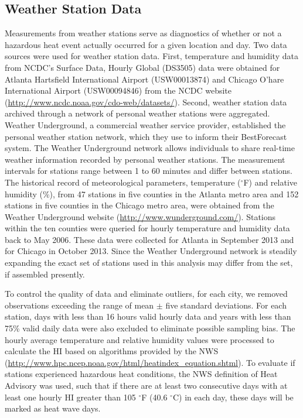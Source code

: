 \documentclass{ametsoc}
\begin{document}
\subsection{Weather Station Data}\label{subsec:WUNDERdata}
Measurements from weather stations serve as diagnostics of whether or not a hazardous heat event actually occurred for a given location and day. Two data sources were used for weather station data. First, temperature and humidity data from NCDC's Surface Data, Hourly Global (DS3505) data were obtained for Atlanta Hartsfield International Airport (USW00013874) and Chicago O'hare International Airport (USW00094846) from the NCDC website (\url{http://www.ncdc.noaa.gov/cdo-web/datasets/}). Second, weather station data archived through a network of personal weather stations were aggregated. Weather Underground, a commercial weather service provider, established the personal weather station network, which they use to inform their BestForecast\textsuperscript{\textregistered} system. The Weather Underground network allows individuals to share real-time weather information recorded by personal weather stations. The measurement intervals for stations range between 1 to 60 minutes and differ between stations. The historical record of meteorological parameters, temperature ($^{\circ}$F) and relative humidity (\%), from 47 stations in five counties in the Atlanta metro area and 152 stations in five counties in the Chicago metro area, were obtained from the Weather Underground website (\url{http://www.wunderground.com/}). Stations within the ten counties were queried for hourly temperature and humidity data back to May 2006. These data were collected for Atlanta in September 2013 and for Chicago in October 2013. Since the Weather Underground network is steadily expanding the exact set of stations used in this analysis may differ from the set, if assembled presently. 

To control the quality of data and eliminate outliers, for each city, we removed observations exceeding the range of mean $\pm$ five standard deviations. For each station, days with less than 16 hours valid hourly data and years with less than 75\% valid daily data were also excluded to eliminate possible sampling bias. The hourly average temperature and relative humidity values were processed to calculate the HI based on algorithms provided by the NWS (\url{http://www.hpc.ncep.noaa.gov/html/heatindex_equation.shtml}). To evaluate if stations experienced hazardous heat conditions, the NWS definition of Heat Advisory was used, such that if there are at least two consecutive days with at least one hourly HI greater than 105 $^{\circ}$F (40.6 $^{\circ}$C) in each day, these days will be marked as heat wave days.
\end{document}
